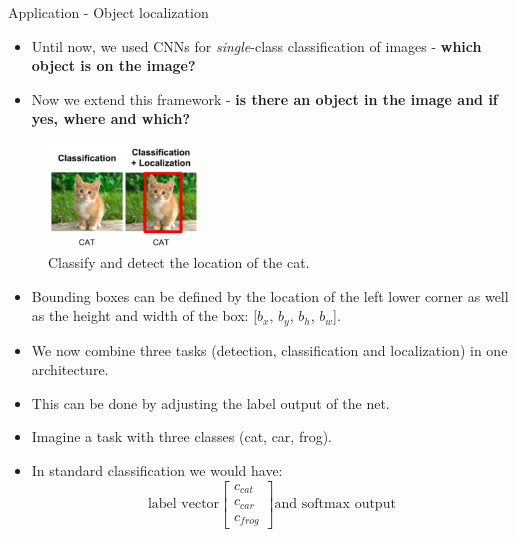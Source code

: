                 \begin{vbframe}{Application - Object localization}
            \begin{itemize}
            \item Until now, we used CNNs for \textit{single}-class classification of images - \textbf{which object is on the image?}
            \item Now we extend this framework - \textbf{is there an object in the image and if yes, where and which?}
            \end{itemize}
            \begin{figure}
            \centering
            \includegraphics[width=4cm]{plots/application/localize_cat.png}
            \caption{Classify and detect the location of the cat.}
            \end{figure}
            \framebreak
            \begin{itemize}
            \item Bounding boxes can be defined by the location of the left lower corner as well as the height and width of the box: [$b_x$, $b_y$, $b_h$, $b_w$].
            \item We now combine three tasks (detection, classification and localization) in one architecture.
            \item This can be done by adjusting the label output of the net.
            \item Imagine a task with three classes (cat, car, frog).
            \item In standard classification we would have: 
                $$
                \text{label vector}
            \begin{bmatrix}
            c_{cat}\\
            c_{car} \\
            c_{frog}
            \end{bmatrix}
            \text{and softmax output}
$$
\end{itemize}
\end{vbframe}
